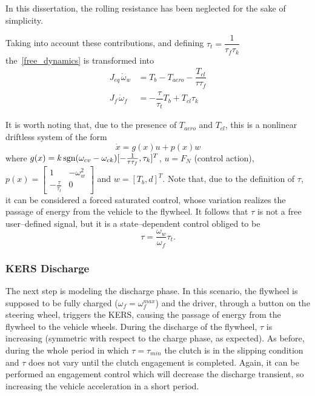 \documentclass[11pt]{article}
\begin{document}
In this dissertation, the rolling resistance has been neglected for the sake of simplicity.

Taking into account these contributions, and defining $\tau_{t} = \dfrac{1}{\tau_f \tau_k}$ the~\eqref{free_dynamics} is transformed into 
\begin{equation}
\begin{split}
J_{eq\,} \dot{\omega}_w & = T_b - T_{aero} - \dfrac{T_{cl}}{\tau \tau_f} \\
J_f\, \dot{\omega}_f & = -\dfrac{\tau}{\tau_{t}} T_b + T_{cl} \tau_k
\end{split}
\label{kers_full_dynamics_charge}
\end{equation}

It is worth noting that, due to the presence of $T_{aero}$ and $T_{cl}$, this is a nonlinear driftless system of the form
\[
\dot{x} = g(x)u + p(x)w 
\]
where $g(x) = k \, \textup{sgn} (\omega_{cv} - \omega_{ck}) [-\frac{1}{\tau \tau_f} , \tau_k]^T$, $u = F_N$ (control action), $p(x) =\left[  \begin{smallmatrix}
1 & -\omega_w^2 \\
-\frac{\tau}{\tau_t} & 0
\end{smallmatrix}\right] $
and $w = [T_b, d]^T$. Note that, due to the definition of $\tau$, it can be considered a forced saturated control, whose variation realizes the passage of energy from the vehicle to the flywheel. It follows that $\tau$ is not a free user--defined signal, but it is a state--dependent control obliged to be
\[
\tau = \dfrac{\omega_w}{\omega_f} \tau_t.
\]

\subsubsection{KERS Discharge}

The next step is modeling the discharge phase. In this scenario, the flywheel is supposed to be fully charged ($\omega_f = \omega_f^{max}$) and the driver, through a button on the steering wheel, triggers the KERS, causing the passage of energy from the flywheel to the vehicle wheels. During the discharge of the flywheel, $\tau$ is increasing (symmetric with respect to the charge phase, as expected). As before, during the whole period in which $\tau = \tau_{min}$ the clutch is in the slipping condition and $\tau$ does not vary until the clutch engagement is completed. Again, it can be performed an engagement control which will decrease the discharge transient, so increasing the vehicle acceleration in a short period.
\end{document}
